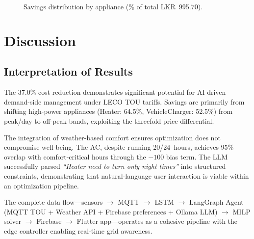 \documentclass[10pt,a4paper,twocolumn]{article}
\begin{document}
\begin{figure}[H]
    \centering
    \caption{Savings distribution by appliance (\% of total LKR~995.70).}
    \label{fig:savings_pie}
\end{figure}

\section{Discussion}

\subsection{Interpretation of Results}
The 37.0\% cost reduction demonstrates significant potential for AI-driven demand-side management under LECO TOU tariffs. Savings are primarily from shifting high-power appliances (Heater: 64.5\%, VehicleCharger: 52.5\%) from peak/day to off-peak bands, exploiting the threefold price differential.

The integration of weather-based comfort ensures optimization does not compromise well-being. The AC, despite running 20/24~hours, achieves 95\% overlap with comfort-critical hours through the $-100$ bias term. The LLM successfully parsed \textit{``Heater need to turn only night times''} into structured constraints, demonstrating that natural-language user interaction is viable within an optimization pipeline.

The complete data flow---sensors $\rightarrow$ MQTT $\rightarrow$ LSTM $\rightarrow$ LangGraph Agent (MQTT TOU + Weather API + Firebase preferences + Ollama LLM) $\rightarrow$ MILP solver $\rightarrow$ Firebase $\rightarrow$ Flutter app---operates as a cohesive pipeline with the edge controller enabling real-time grid awareness.
\end{document}
